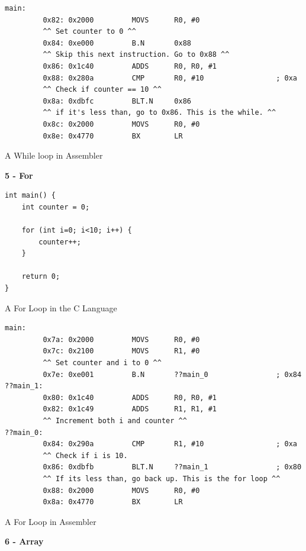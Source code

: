 \documentclass[12pt,a4paper]{report}
\begin{document}
\begin{normalsize}
\lstset{language=[x86masm]Assembler}
\begin{lstlisting}
main:
         0x82: 0x2000         MOVS      R0, #0
         ^^ Set counter to 0 ^^
         0x84: 0xe000         B.N       0x88
         ^^ Skip this next instruction. Go to 0x88 ^^
         0x86: 0x1c40         ADDS      R0, R0, #1
         0x88: 0x280a         CMP       R0, #10                 ; 0xa
         ^^ Check if counter == 10 ^^
         0x8a: 0xdbfc         BLT.N     0x86
         ^^ if it's less than, go to 0x86. This is the while. ^^
         0x8c: 0x2000         MOVS      R0, #0
         0x8e: 0x4770         BX        LR
\end{lstlisting}	
\begin{center}
\small{A While loop in Assembler}
\end{center}


\textbf{5 - For} \\

\lstset{language=C}
\begin{lstlisting}
int main() {
    int counter = 0;

    for (int i=0; i<10; i++) {
        counter++;
    }

    return 0;
}
\end{lstlisting}	
\begin{center}
\small{A For Loop in the C Language}
\end{center}

\lstset{language=[x86masm]Assembler}
\begin{lstlisting}
main:
         0x7a: 0x2000         MOVS      R0, #0
         0x7c: 0x2100         MOVS      R1, #0
         ^^ Set counter and i to 0 ^^
         0x7e: 0xe001         B.N       ??main_0                ; 0x84
??main_1:
         0x80: 0x1c40         ADDS      R0, R0, #1
         0x82: 0x1c49         ADDS      R1, R1, #1
         ^^ Increment both i and counter ^^
??main_0:
         0x84: 0x290a         CMP       R1, #10                 ; 0xa
         ^^ Check if i is 10.
         0x86: 0xdbfb         BLT.N     ??main_1                ; 0x80
         ^^ If its less than, go back up. This is the for loop ^^         
         0x88: 0x2000         MOVS      R0, #0
         0x8a: 0x4770         BX        LR
\end{lstlisting}	
\begin{center}
\small{A For Loop in Assembler}
\end{center}


\textbf{6 - Array} \\


\end{normalsize}
\end{document}
